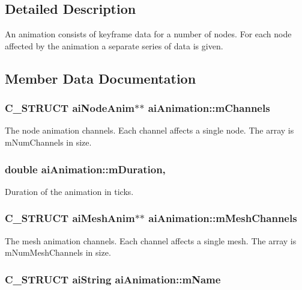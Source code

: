 \subsection{Detailed Description}
An animation consists of keyframe data for a number of nodes. For each node affected by the animation a separate series of data is given. 

\subsection{Member Data Documentation}
\hypertarget{structai_animation_a89244bb68b725ffbb85137174c28e757}{
\subsubsection[{m\+Channels}]{\setlength{\rightskip}{0pt plus 5cm}C\+\_\+\+S\+T\+R\+U\+C\+T {\bf ai\+Node\+Anim}$\ast$$\ast$ ai\+Animation\+::m\+Channels}}\label{structai_animation_a89244bb68b725ffbb85137174c28e757}
The node animation channels. Each channel affects a single node. The array is m\+Num\+Channels in size. \hypertarget{structai_animation_ae2bbc49320b4b75c05e23e0ab704ece7}{
\subsubsection[{m\+Duration}]{\setlength{\rightskip}{0pt plus 5cm}double ai\+Animation\+::m\+Duration\hspace{0.3cm}{\ttfamily [get]}, {\ttfamily [set]}}}\label{structai_animation_ae2bbc49320b4b75c05e23e0ab704ece7}
Duration of the animation in ticks. \hypertarget{structai_animation_af05138121dbde8b31aa031505b454c85}{
\subsubsection[{m\+Mesh\+Channels}]{\setlength{\rightskip}{0pt plus 5cm}C\+\_\+\+S\+T\+R\+U\+C\+T {\bf ai\+Mesh\+Anim}$\ast$$\ast$ ai\+Animation\+::m\+Mesh\+Channels}}\label{structai_animation_af05138121dbde8b31aa031505b454c85}
The mesh animation channels. Each channel affects a single mesh. The array is m\+Num\+Mesh\+Channels in size. \hypertarget{structai_animation_a1be7d78d88694173a7ceef658fea77f1}{
\subsubsection[{m\+Name}]{\setlength{\rightskip}{0pt plus 5cm}C\+\_\+\+S\+T\+R\+U\+C\+T {\bf ai\+String} ai\+Animation\+::m\+Name}}\label{structai_animation_a1be7d78d88694173a7ceef658fea77f1}
